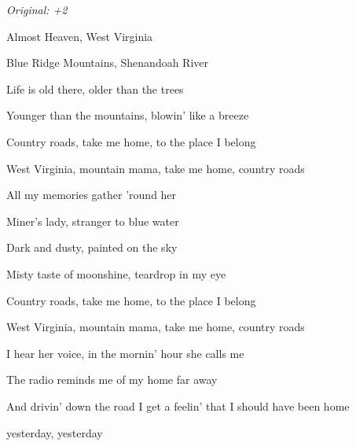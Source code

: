\begin{song}


\begin{strumbox}
\textit{Original: +2}
\end{strumbox}

\begin{hchordbox}
\end{hchordbox}

\large

\bigskip

 Almost Heaven,  West Virginia \par
{} Blue Ridge Mountains, Shenandoah River \par
{} Life is old there, older than the trees \par
{}Younger than the mountains, blowin' like a breeze \par

\bigskip

Country roads, take me home, to the place I belong \par
West Virginia, mountain mama, take me home, country roads \par

\bigskip

 All my memories  gather 'round her \par
{} Miner's lady, stranger to blue water \par
{} Dark and dusty, painted on the sky \par
{}Misty taste of moonshine, teardrop in my eye \par

\bigskip

Country roads, take me home, to the place I belong \par
West Virginia, mountain mama, take me home, country roads \par

\bigskip

 I hear her voice, in the mornin' hour she calls me \par
The radio reminds me of my home far away \par
And drivin' down the road I get a feelin' that I should have been home \par
{}yesterday, yesterday \par


\end{song}
